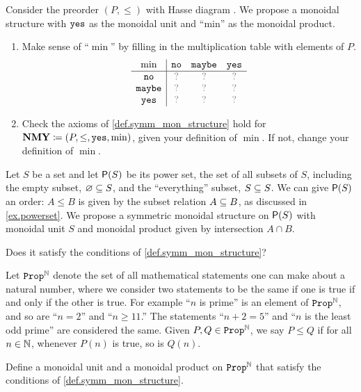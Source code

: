 \documentclass[7Sketches]{subfiles}
\begin{document}
\begin{exercise}%
\label{exc.no_maybe_yes}%
Consider the preorder $(P,\leq)$ with Hasse diagram . We propose a monoidal structure with $\const{yes}$ as the monoidal unit and ``min'' as the monoidal product.
\begin{enumerate}
	\item Make sense of ``$\min$'' by filling in the multiplication table with elements of $P$.
\[
\begin{array}{c|ccc}
	\min&\const{no}&\const{maybe}&\const{yes}\\\hline
	\const{no}&\?&\?&\?\\
	\const{maybe}&\?&\?&\?\\
	\const{yes}&\?&\?&\?
\end{array}
\]
	\item Check the axioms of \cref{def.symm_mon_structure} hold for $\Cat{NMY}\coloneqq(P,\leq,\const{yes},\min)$, given your definition of $\min$. If not, change your definition of $\min$.
\qedhere
\end{enumerate}
\end{exercise}



\begin{exercise}%
\label{exc.powerset_symm_mon_pos}%
%
Let $S$ be a set and let $\powset(S)$ be its power set, the set of all subsets of
$S$, including the empty subset, $\varnothing\ss S$, and the ``everything''
subset, $S\ss S$. We can give $\powset(S)$ an order: $A\leq B$ is given by the
subset relation $A\ss B$, as discussed in \cref{ex.powerset}. We propose a
symmetric monoidal structure on $\powset(S)$ with monoidal unit $S$ and monoidal product given by intersection $A\cap B$.%

Does it satisfy the conditions of \cref{def.symm_mon_structure}?
\end{exercise}

\begin{exercise}%
\label{exc.propositions_preorder}%
%
Let $\Prop^{\NN}$ denote the set of all mathematical statements one can make
about a natural number, where we consider two statements to be the same if one
is true if and only if the other is true. For example ``$n$ is prime'' is an
element of $\Prop^\NN$, and so are ``$n=2$'' and ``$n\geq 11$.'' The statements
``$n+2=5$'' and ``$n$ is the least odd prime'' are considered the same. Given
$P,Q\in\Prop^\NN$, we say $P\leq Q$ if for all $n\in\NN$, whenever $P(n)$ is
true, so is $Q(n)$.

Define a monoidal unit and a monoidal product on $\Prop^\NN$ that satisfy the
conditions of \cref{def.symm_mon_structure}.
\end{exercise}
\end{document}

